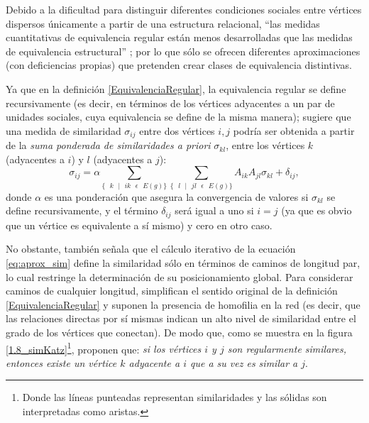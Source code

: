 \documentclass[letterpaper, 11pt]{book}
\theoremstyle{definition}
\theoremstyle{remark}
\begin{document}
Debido a la dificultad para distinguir diferentes condiciones sociales entre vértices dispersos únicamente a partir de una estructura relacional, ``las  medidas cuantitativas de equivalencia regular están menos desarrolladas que las medidas de equivalencia estructural'' \citep[221]{2010_Newman_Networks}; por lo que sólo se ofrecen diferentes aproximaciones (con deficiencias propias) que pretenden crear clases de equivalencia distintivas. 


Ya que en la definición \ref{EquivalenciaRegular}, la equivalencia regular se define recursivamente (es decir, en términos de los vértices adyacentes a un par de unidades sociales, cuya equivalencia se define de la misma manera); \citet{2010_Newman_Networks} sugiere que una medida de similaridad $\sigma_{ij}$ entre dos vértices $i,j$ podría ser obtenida a partir de la \emph{suma ponderada de similaridades a priori} $\sigma_{kl}$, entre los vértices $k$ (adyacentes a $i$) y $l$ (adyacentes a $j$):
\begin{equation}\label{eq:aprox_sim}
    \sigma_{ij} = \alpha \sum_{\{\text{ }k \text{ }|\text{ } ik \text{ } \epsilon \text{ } E(g)\}}\sum_{\{\text{ }l\text{ } | \text{ }jl \text{ } \epsilon \text{ } E(g)\}} A_{ik}A_{jl}\sigma_{kl} + \delta_{ij},
\end{equation}
donde $\alpha$ es una ponderación que asegura la convergencia de valores si $\sigma_{kl}$ se define recursivamente, y el término $\delta_{ij}$ será igual a uno si $i=j$ (ya que es obvio que un vértice es equivalente a sí mismo) y cero en otro caso. 


No obstante, \citet{2010_Newman_Networks} también señala que el cálculo iterativo de la ecuación \ref{eq:aprox_sim} define la similaridad sólo en términos de caminos de longitud par, lo cual restringe la determinación de su posicionamiento global. 
Para considerar caminos de cualquier longitud, \citet{2006_Newman_Similarity} simplifican el sentido original de la definición \ref{EquivalenciaRegular} y suponen la presencia de homofilia en la red (es decir, que las relaciones directas por sí mismas indican un alto nivel de similaridad entre el grado de los vértices que conectan). 
De modo que, como se muestra en la figura \ref{1.8_simKatz}\footnote{
    Donde las líneas punteadas representan similaridades y las sólidas son interpretadas como aristas. 
}, 
proponen que: \emph{si los vértices $i$ y $j$ son regularmente similares, entonces existe un vértice $k$ adyacente a $i$ que a su vez es similar a $j$}. 
\end{document}
